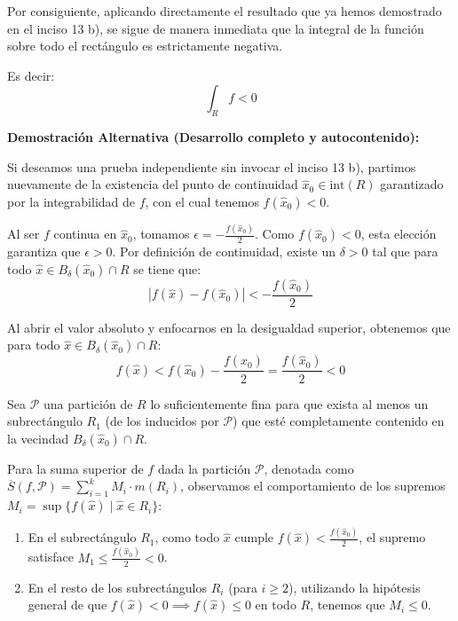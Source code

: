 \documentclass[11pt,letterpaper]{article}
\begin{document}
Por consiguiente, aplicando directamente el resultado que ya hemos demostrado en el inciso 13 b), se sigue de manera inmediata que la integral de la función sobre todo el rectángulo es estrictamente negativa. 

Es decir:
\begin{equation*}
\int_R f < 0
\end{equation*}

\vspace{0.8cm}

\textbf{Demostración Alternativa (Desarrollo completo y autocontenido):}

Si deseamos una prueba independiente sin invocar el inciso 13 b), partimos nuevamente de la existencia del punto de continuidad $\hat{x}_0 \in \text{int}(R)$ garantizado por la integrabilidad de $f$, con el cual tenemos $f(\hat{x}_0) < 0$. 

Al ser $f$ continua en $\hat{x}_0$, tomamos $\epsilon = -\frac{f(\hat{x}_0)}{2}$. Como $f(\hat{x}_0) < 0$, esta elección garantiza que $\epsilon > 0$. Por definición de continuidad, existe un $\delta > 0$ tal que para todo $\hat{x} \in B_\delta(\hat{x}_0) \cap R$ se tiene que:
\begin{equation*}
|f(\hat{x}) - f(\hat{x}_0)| < -\frac{f(\hat{x}_0)}{2}
\end{equation*}

Al abrir el valor absoluto y enfocarnos en la desigualdad superior, obtenemos que para todo $\hat{x} \in B_\delta(\hat{x}_0) \cap R$:
\begin{equation*}
f(\hat{x}) < f(\hat{x}_0) - \frac{f(\hat{x}_0)}{2} = \frac{f(\hat{x}_0)}{2} < 0
\end{equation*}

Sea $\mathcal{P}$ una partición de $R$ lo suficientemente fina para que exista al menos un subrectángulo $R_1$ (de los inducidos por $\mathcal{P}$) que esté completamente contenido en la vecindad $B_\delta(\hat{x}_0) \cap R$. 

Para la suma superior de $f$ dada la partición $\mathcal{P}$, denotada como $\overline{S}(f, \mathcal{P}) = \sum_{i=1}^{k} M_i \cdot m(R_i)$, observamos el comportamiento de los supremos $M_i = \sup \{ f(\hat{x}) \mid \hat{x} \in R_i \}$:
\begin{enumerate}
    \item En el subrectángulo $R_1$, como todo $\hat{x}$ cumple $f(\hat{x}) < \frac{f(\hat{x}_0)}{2}$, el supremo satisface $M_1 \le \frac{f(\hat{x}_0)}{2} < 0$.
    \item En el resto de los subrectángulos $R_i$ (para $i \ge 2$), utilizando la hipótesis general de que $f(\hat{x}) < 0 \implies f(\hat{x}) \le 0$ en todo $R$, tenemos que $M_i \le 0$.
\end{enumerate}
\end{document}
